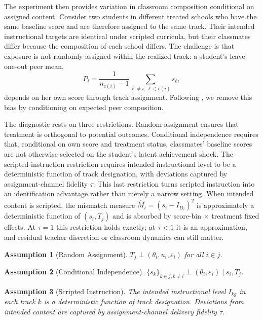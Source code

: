 \documentclass[11pt]{article}
\newtheorem{assumption}{Assumption}
\begin{document}
The experiment then provides variation in classroom composition conditional on assigned content. Consider two students in different treated schools who have the same baseline score and are therefore assigned to the same track. Their intended instructional targets are identical under scripted curricula, but their classmates differ because the composition of each school differs. The challenge is that exposure is not randomly assigned within the realized track: a student's leave-one-out peer mean,
\begin{equation}
P_i = \frac{1}{n_{c(i)}-1}\sum_{\ell \neq i,\, \ell \in c(i)} s_\ell,
\end{equation}
depends on her own score through track assignment. Following \citet{borusyak2023nonrandom}, we remove this bias by conditioning on expected peer composition.

The diagnostic rests on three restrictions. Random assignment ensures that treatment is orthogonal to potential outcomes. Conditional independence requires that, conditional on own score and treatment status, classmates' baseline scores are not otherwise selected on the student's latent achievement shock. The scripted-instruction restriction requires intended instructional level to be a deterministic function of track designation, with deviations captured by assignment-channel fidelity $\tau$. This last restriction turns scripted instruction into an identification advantage rather than merely a narrow setting. When intended content is scripted, the mismatch measure $\hat{M}_i = (s_i - I_{D_i})^2$ is approximately a deterministic function of $(s_i,T_j)$ and is absorbed by score-bin $\times$ treatment fixed effects. At $\tau = 1$ this restriction holds exactly; at $\tau < 1$ it is an approximation, and residual teacher discretion or classroom dynamics can still matter.

\begin{assumption}[Random Assignment]
$T_j \perp (\theta_i, u_i, \varepsilon_i)$ for all $i \in j$.
\end{assumption}

\begin{assumption}[Conditional Independence]
$\{s_k\}_{k \in j, k \neq i} \perp (\theta_i, \varepsilon_i) \mid s_i, T_j$.
\end{assumption}

\begin{assumption}[Scripted Instruction]
The intended instructional level $I_{kg}$ in each track $k$ is a deterministic function of track designation. Deviations from intended content are captured by assignment-channel delivery fidelity $\tau$.
\end{assumption}
\end{document}
